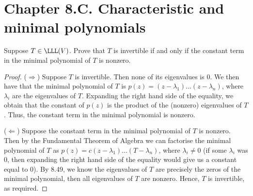 \section*{Chapter 8.C. Characteristic and minimal polynomials}


\begin{exercise}{8}
  Suppose $T\in\LLL(V)$. Prove that $T$ is invertible if and only if the constant term in the minimal polynomial of $T$ is nonzero.
\end{exercise}
\begin{proof}
 ($\Rightarrow$) Suppose $T$ is invertible. Then none of its eigenvalues is 0. We then have that the minimal polynomial of $T$ is $p(z)=(z-\lambda_1)\dots(z-\lambda_n)$, where $\lambda_i$ are the eigenvalues of $T$. Expanding the right hand side of the equality, we obtain that the constant of $p(z)$ is the product of the (nonzero) eigenvalues of $T$. Thus, the constant term in the minimal polynomial is nonzero.

 ($\Leftarrow$) Suppose the constant term in the minimal polynomial of $T$ is nonzero. Then by the Fundamental Theorem of Algebra we can factorise the minimal polynomial of $T$ as $p(z)=c(z-\lambda_1)\dots(T-\lambda_n)$, where $\lambda_i\neq 0$ (if some $\lambda_i$ was 0, then expanding the right hand side of the equality would give us a constant equal to 0). By 8.49, we know the eigenvalues of $T$ are precisely the zeros of the minimal polynomial, then all eigenvalues of $T$ are nonzero. Hence, $T$ is invertible, as required.
\end{proof}

